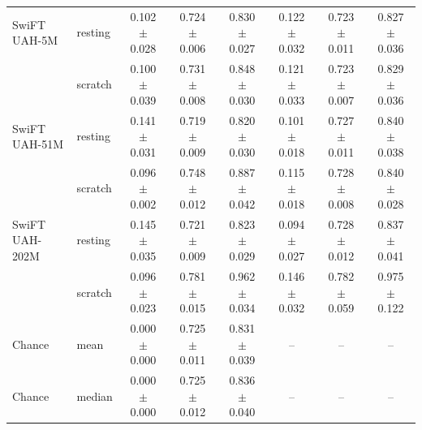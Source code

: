 \begin{table}[H]
{\begin{tabular}{llcccccc}
SwiFT UAH-5M & resting & 0.102 $\pm$ 0.028 & 0.724 $\pm$ 0.006 & 0.830 $\pm$ 0.027 & 0.122 $\pm$ 0.032 & 0.723 $\pm$ 0.011 & 0.827 $\pm$ 0.036 \\
 & scratch & 0.100 $\pm$ 0.039 & 0.731 $\pm$ 0.008 & 0.848 $\pm$ 0.030 & 0.121 $\pm$ 0.033 & 0.723 $\pm$ 0.007 & 0.829 $\pm$ 0.036 \\
SwiFT UAH-51M & resting & 0.141 $\pm$ 0.031 & 0.719 $\pm$ 0.009 & 0.820 $\pm$ 0.030 & 0.101 $\pm$ 0.018 & 0.727 $\pm$ 0.011 & 0.840 $\pm$ 0.038 \\
 & scratch & 0.096 $\pm$ 0.002 & 0.748 $\pm$ 0.012 & 0.887 $\pm$ 0.042 & 0.115 $\pm$ 0.018 & 0.728 $\pm$ 0.008 & 0.840 $\pm$ 0.028 \\
SwiFT UAH-202M & resting & 0.145 $\pm$ 0.035 & 0.721 $\pm$ 0.009 & 0.823 $\pm$ 0.029 & 0.094 $\pm$ 0.027 & 0.728 $\pm$ 0.012 & 0.837 $\pm$ 0.041 \\
 & scratch & 0.096 $\pm$ 0.023 & 0.781 $\pm$ 0.015 & 0.962 $\pm$ 0.034 & 0.146 $\pm$ 0.032 & 0.782 $\pm$ 0.059 & 0.975 $\pm$ 0.122 \\
\midrule
Chance & mean & 0.000 $\pm$ 0.000 & 0.725 $\pm$ 0.011 & 0.831 $\pm$ 0.039 & -- & -- & -- \\
Chance & median & 0.000 $\pm$ 0.000 & 0.725 $\pm$ 0.012 & 0.836 $\pm$ 0.040 & -- & -- & -- \\
\bottomrule
\end{tabular}%
}
\end{table}